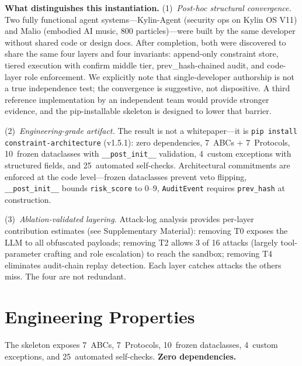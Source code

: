 \documentclass[letterpaper]{article} %
\begin{document}
\textbf{What distinguishes this instantiation.}
(1)~\textit{Post-hoc structural convergence.} Two fully functional agent
systems---Kylin-Agent (security ops on Kylin OS V11) and Malio (embodied AI
music, 800 particles)---were built by the same developer without shared code or
design docs.  After completion, both were discovered to share the same four
layers and four invariants: append-only constraint store, tiered execution with
confirm middle tier, prev\_hash-chained audit, and code-layer role enforcement.
We explicitly note that single-developer authorship is not a true independence
test; the convergence is suggestive, not dispositive.  A third reference
implementation by an independent team would provide stronger evidence, and the
pip-installable skeleton is designed to lower that barrier.

(2)~\textit{Engineering-grade artifact.} The result is not a whitepaper---it is
\texttt{pip install constraint-architecture} (v1.5.1): zero dependencies, 7~ABCs
+ 7~Protocols, 10~frozen dataclasses with \texttt{\_\_post\_init\_\_} validation,
4~custom exceptions with structured fields, and 25~automated self-checks.
Architectural commitments are enforced at the code level---frozen dataclasses
prevent veto flipping, \texttt{\_\_post\_init\_\_} bounds \texttt{risk\_score}
to 0--9, \texttt{AuditEvent} requires \texttt{prev\_hash} at construction.

(3)~\textit{Ablation-validated layering.} Attack-log analysis provides
per-layer contribution estimates (see Supplementary Material): removing T0
exposes the LLM to all obfuscated payloads; removing T2 allows 3 of 16 attacks
(largely tool-parameter crafting and role escalation) to reach the sandbox;
removing T4 eliminates audit-chain replay detection. Each layer catches
attacks the others miss.  The four are not redundant.

\section{Engineering Properties}

The skeleton exposes 7~ABCs, 7~Protocols, 10~frozen dataclasses,
4~custom exceptions, and 25~automated self-checks. \textbf{Zero dependencies.}
\end{document}
